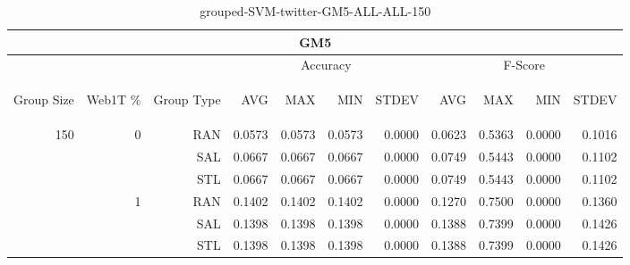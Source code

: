 \begin{center}
\begin{table}[htbp] 
 \begin{center}
\begin{tabular}{ | r | r | r | r | r | r | r | r | r | r | r |}
\hline
\multicolumn{11}{|c|}{GM5}\\
\hline
 & & & \multicolumn{4}{|c|}{Accuracy} & \multicolumn{4}{|c|}{F-Score}\\ \cline{4-11}
\begin{sideways}Group Size\end{sideways} & \begin{sideways}Web1T \%\end{sideways} & \begin{sideways}Group Type\end{sideways} & \begin{sideways}AVG\end{sideways} & \begin{sideways}MAX\end{sideways} & \begin{sideways}MIN\end{sideways} & \begin{sideways}STDEV\end{sideways} & \begin{sideways}AVG\end{sideways} & \begin{sideways}MAX\end{sideways} & \begin{sideways}MIN\end{sideways} & \begin{sideways}STDEV\end{sideways}\\
\hline
\multirow{6}{*}{150}
 & \multirow{3}{*}{0} & RAN & 0.0573 & 0.0573 & 0.0573 & 0.0000 & 0.0623 & 0.5363 & 0.0000 & 0.1016\\ \cline{3-11}
 &   & SAL & 0.0667 & 0.0667 & 0.0667 & 0.0000 & 0.0749 & 0.5443 & 0.0000 & 0.1102\\ \cline{3-11}
 &   & STL & 0.0667 & 0.0667 & 0.0667 & 0.0000 & 0.0749 & 0.5443 & 0.0000 & 0.1102\\ \cline{2-11}
 & \multirow{3}{*}{1} & RAN & 0.1402 & 0.1402 & 0.1402 & 0.0000 & 0.1270 & 0.7500 & 0.0000 & 0.1360\\ \cline{3-11}
 &   & SAL & 0.1398 & 0.1398 & 0.1398 & 0.0000 & 0.1388 & 0.7399 & 0.0000 & 0.1426\\ \cline{3-11}
 &   & STL & 0.1398 & 0.1398 & 0.1398 & 0.0000 & 0.1388 & 0.7399 & 0.0000 & 0.1426\\ \cline{2-11}
\hline
\end{tabular}
\caption{grouped-SVM-twitter-GM5-ALL-ALL-150}
\end{center}
 \end{table}
\end{center}

